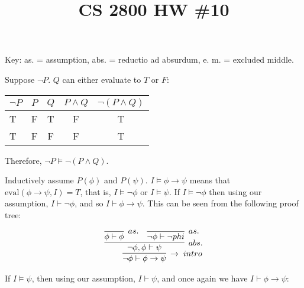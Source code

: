 
\usepackage{proof}
\usepackage{turnstile}

\title{CS 2800 HW \#10}
\author{\name}
\maketitle

Key: as. = assumption, abs. = reductio ad absurdum, e. m. = excluded middle.


Suppose $\neg P$. $Q$ can either evaluate to $T$ or $F$:

\begin{center}
\begin{tabular}{lcccc}
$\neg P$ & $P$ & $Q$ & $P \land Q$ & $\neg(P \land Q)$ \\ \hline
T & F & T & F & T \\
T & F & F & F & T
\end{tabular}
\end{center}

Therefore, $\neg P \models \neg (P \land Q)$.




Inductively assume $P(\phi)$ and $P(\psi)$. $I \models \phi \rightarrow \psi$ means that $\text{eval}(\phi \rightarrow \psi, I) = T$, that is, $I \models \neg\phi$ or $I \models \psi$. If $I \models \neg\phi$ then using our assumption, $I \vdash \neg\phi$, and so $I \vdash \phi \rightarrow \psi$. This can be seen from the following proof tree:

\begin{align*}
\infer[\rightarrow\; intro]{\neg \phi \vdash \phi \rightarrow \psi}{
  \infer[abs.]{\neg \phi, \phi \vdash \psi}{
    \infer[as.]{\phi \vdash \phi}{}
    &
    \infer[as.]{\neg \phi \vdash \neg phi}{}
  }
}
\end{align*}

If $I \models \psi$, then using our assumption, $I \vdash \psi$, and once again we have $I \vdash \phi \rightarrow \psi$:

